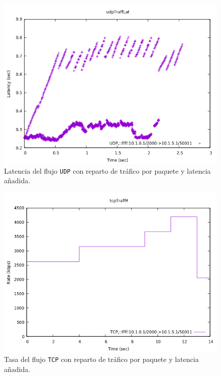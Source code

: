 \documentclass[11pt]{article}
\begin{document}
            \begin{figure}
                \centering
                \includegraphics[width=0.6\linewidth]{udpTraffAddedLatLat.png}
                \caption{Latencia del flujo \texttt{UDP} con reparto de tráfico por paquete y latencia añadida.}
                \label{fig:udpTraffAddedLatLat}
            \end{figure}

            \begin{figure}
                \centering
                \includegraphics[width=0.6\linewidth]{tcpTraffAddedLatR.png}
                \caption{Tasa del flujo \texttt{TCP} con reparto de tráfico por paquete y latencia añadida.}
                \label{fig:tcpTraffAddedLatR}
            \end{figure}
\end{document}
